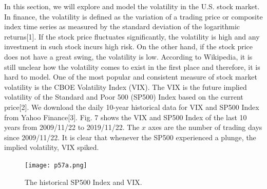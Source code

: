 \documentclass[a4paper, 11pt]{article}
\begin{document}
In this section, we will explore and model the volatility in the U.S. stock market. In finance, the volatility is defined as the variation of a trading price or composite index time series as measured by the standard deviation of the logarithmic returns[1]. If the stock price fluctuates significantly, the volatility is high and any investment in such stock incurs high risk. On the other hand, if the stock price does not have a great swing, the volatility is low. According to Wikipedia, it is still unclear how the volatility comes to exist in the first place and therefore, it is hard to model. One of the most popular and consistent measure of stock market volatility is the CBOE Volatility Index (VIX). The VIX is the future implied volatility of the Standard and Poor 500 (SP500) Index based on the current price[2]. We download the daily 10-year historical data for VIX and SP500 Index from Yahoo Finance[3]. Fig. 7 shows the VIX and SP500 Index of the last 10 years from 2009/11/22 to 2019/11/22. The $x$ axes are the number of trading days since 2009/11/22. It is clear that whenever the SP500 experienced a plunge, the implied volatility, VIX spiked. 

 
\begin{figure}
	\begin{center}
		\texttt{[image: p57a.png]}
		\caption{The historical SP500 Index and VIX. } 
	\end{center}
\end{figure}
\end{document}
